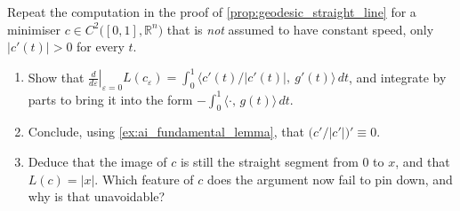 \begin{aiexercise}
\label{ex:ai_variation_without_constant_speed}
Repeat the computation in the proof of \cref{prop:geodesic_straight_line} for a minimiser
$c \in C^2\big([0,1],\mathbb{R}^n\big)$ that is \emph{not} assumed to have constant speed, only
$\lvert c'(t)\rvert > 0$ for every $t$.
\begin{enumerate}[label=\textbf{(\alph*)}]
  \item Show that $\left.\frac{d}{d\varepsilon}\right|_{\varepsilon=0}L(c_\varepsilon)
    = \int_0^1 \big\langle c'(t)/\lvert c'(t)\rvert,\ g'(t)\big\rangle\,dt$, and integrate by
    parts to bring it into the form $-\int_0^1\langle \cdot,\,g(t)\rangle\,dt$.
  \item Conclude, using \cref{ex:ai_fundamental_lemma}, that
    $\big(c'/\lvert c'\rvert\big)' \equiv 0$.
  \item Deduce that the image of $c$ is still the straight segment from $0$ to $x$, and that
    $L(c) = \lvert x\rvert$. Which feature of $c$ does the argument now fail to pin down, and
    why is that unavoidable?
\end{enumerate}
\end{aiexercise}

